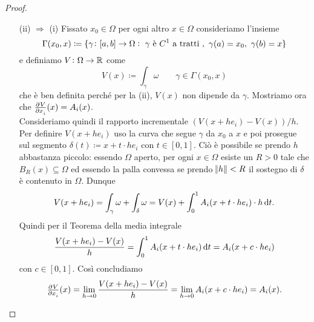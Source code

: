 \begin{proof}
\begin{enumerate}
		\item[(ii) $ \Rightarrow $ (i)] Fissato $ x_0 \in \Omega $ per ogni altro $ x \in \Omega $ consideriamo l'insieme
		\[
			\Gamma(x_0, x) \coloneqq \{\gamma \colon [a, b] \to \Omega : \text{ $ \gamma $ è $ C^1 $ a tratti }, \ \gamma(a) = x_0, \ \gamma(b) = x\}
		\]
		e definiamo $ V \colon \Omega \to \mathbb{R} $ come
		\[
			V(x) \coloneqq \int_{\gamma} \omega \qquad \gamma \in \Gamma(x_0, x)
		\]
		che è ben definita perché per la (ii), $ V(x) $ non dipende da $ \gamma $. Mostriamo ora che $ \pd{V}{x_i}(x) = A_i(x) $. \\
		Consideriamo quindi il rapporto incrementale $ (V(x + he_i) - V(x))/h $. Per definire $ V(x + he_i) $ uso la curva che segue $ \gamma $ da $ x_0 $ a $ x $ e poi prosegue sul segmento $ \delta(t) \coloneqq x + t \cdot he_i $ con $ t \in [0, 1] $. Ciò è possibile se prendo $ h $ abbastanza piccolo: essendo $ \Omega $ aperto, per ogni $ x \in \Omega $ esiste un $ R > 0 $ tale che $ B_R(x) \subseteq \Omega $ ed essendo la palla convessa se prendo $ \norm{h} < R $ il sostegno di $ \delta $ è contenuto in $ \Omega $. Dunque
		\[
			V(x + he_i) = \int_{\gamma} \omega + \int_{\delta} \omega = V(x) + \int_{0}^{1} A_i(x + t \cdot he_i) \cdot h \dif{t}.
		\]
		Quindi per il Teorema della media integrale
		\[
			\frac{V(x + he_i) - V(x)}{h} = \int_{0}^{1}  A_i(x + t \cdot he_i) \dif{t} = A_i(x + c \cdot he_i)
		\]
		con $ c \in [0, 1] $. Così concludiamo
		\[
			\pd{V}{x_i}(x) = \lim_{h \to 0} \frac{V(x + he_i) - V(x)}{h} = \lim_{h \to 0} A_i(x + c \cdot he_i) = A_i(x). \qedhere
		\]
	\end{enumerate}
\end{proof}

